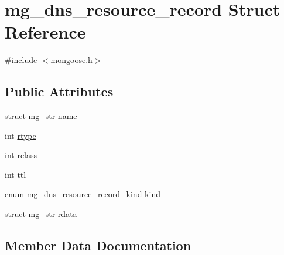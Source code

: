 \hypertarget{structmg__dns__resource__record}{}\section{mg\+\_\+dns\+\_\+resource\+\_\+record Struct Reference}
\label{structmg__dns__resource__record}


{\ttfamily \#include $<$mongoose.\+h$>$}

\subsection*{Public Attributes}
\begin{DoxyCompactItemize}
\item 
struct \hyperlink{structmg__str}{mg\+\_\+str} \hyperlink{structmg__dns__resource__record_afd27e187a02127a98a04757013aecd48_afd27e187a02127a98a04757013aecd48}{name}
\item 
int \hyperlink{structmg__dns__resource__record_a9d314632522fcca513858285c639bee9_a9d314632522fcca513858285c639bee9}{rtype}
\item 
int \hyperlink{structmg__dns__resource__record_a9be7dc2d7ef4e2dc20413289a55f6ff7_a9be7dc2d7ef4e2dc20413289a55f6ff7}{rclass}
\item 
int \hyperlink{structmg__dns__resource__record_aa5d1c1a7ba2d02908c27fab68ded25be_aa5d1c1a7ba2d02908c27fab68ded25be}{ttl}
\item 
enum \hyperlink{mongoose_8h_abc1e540c922be63eea4488f520e3523d_abc1e540c922be63eea4488f520e3523d}{mg\+\_\+dns\+\_\+resource\+\_\+record\+\_\+kind} \hyperlink{structmg__dns__resource__record_a6f9d5dda9d8ae9240a74282c44d4a555_a6f9d5dda9d8ae9240a74282c44d4a555}{kind}
\item 
struct \hyperlink{structmg__str}{mg\+\_\+str} \hyperlink{structmg__dns__resource__record_ac169801d0c9ce94137fcce9a3f629152_ac169801d0c9ce94137fcce9a3f629152}{rdata}
\end{DoxyCompactItemize}


\subsection{Member Data Documentation}
\mbox{\label{structmg__dns__resource__record_a6f9d5dda9d8ae9240a74282c44d4a555_a6f9d5dda9d8ae9240a74282c44d4a555}} 
